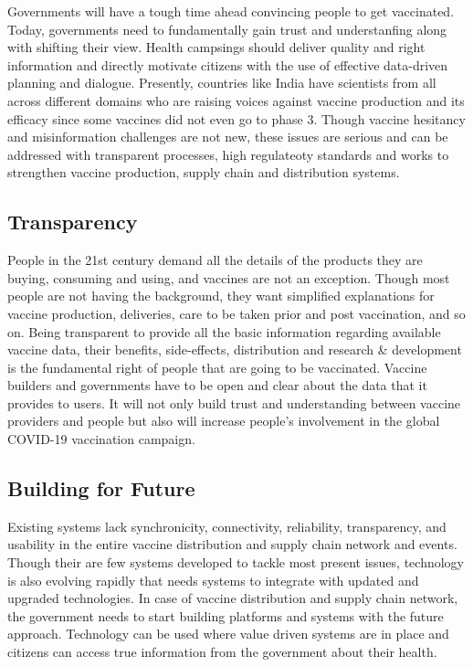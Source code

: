 \documentclass{article}
\begin{document}
Governments will have a tough time ahead convincing people to get vaccinated. Today, governments need to fundamentally gain trust and understanfing along with shifting their view. Health campsings should deliver quality and right information and directly motivate citizens with the use of effective data-driven planning and dialogue. Presently, countries like India have scientists from all across different domains who are raising voices against vaccine production and its efficacy since some vaccines did not even go to phase 3. Though vaccine hesitancy and misinformation challenges are not new, these issues are serious and can be addressed with transparent processes, high regulateoty standards and works to strengthen vaccine production, supply chain and distribution systems.

\subsection{Transparency}

People in the 21st century demand all the details of the products they are buying, consuming and using, and vaccines are not an exception. Though most people are not having the background, they want simplified explanations for vaccine production, deliveries, care to be taken prior and post vaccination, and so on. Being transparent to provide all the basic information regarding available vaccine data, their benefits, side-effects, distribution and research & development is the fundamental right of people that are going to be vaccinated. Vaccine builders and governments have to be open and clear about the data that it provides to users. It will not only build trust and understanding between vaccine providers and people but also will increase people's involvement in the global COVID-19 vaccination campaign.

\subsection{Building for Future}

Existing systems lack synchronicity, connectivity, reliability, transparency, and usability in the entire vaccine distribution and supply chain network and events. Though their are few systems developed to tackle most present issues, technology is also evolving rapidly that needs systems to integrate with updated and upgraded technologies. In case of vaccine distribution and supply chain network, the government needs to start building platforms and systems with the future approach. Technology can be used where value driven systems are in place and citizens can access true information from the government about their health.	
\end{document}
